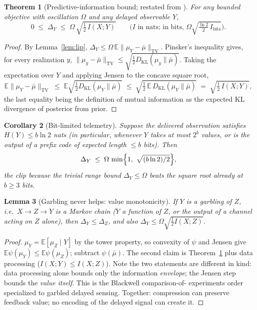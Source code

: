 \documentclass[11pt]{article}
\newtheorem{theorem}{Theorem}
\newtheorem{corollary}[theorem]{Corollary}
\newtheorem{lemma}[theorem]{Lemma}
\newcommand{\TV}{\mathrm{TV}}
\newcommand{\KL}{D_{\mathrm{KL}}}
\newcommand{\E}{\mathbb{E}}
\begin{document}
\begin{theorem}[Predictive-information bound; restated from {\cite{xu20,gyorfi23}}]\label{thm:mi}
For any bounded objective with oscillation $\Omega$ and any delayed
observable $Y$,
\begin{equation}\label{eq:mi}
0\;\le\;\Delta_Y\;\le\;\Omega\,\sqrt{\tfrac12\,I(X;Y)}
\qquad\text{($I$ in nats; in bits, }\Omega\sqrt{\tfrac{\ln 2}{2}\,I_{\mathrm{bits}}}\text{).}
\end{equation}
\end{theorem}

\begin{proof}
By Lemma~\ref{lem:lip}, $\Delta_Y\le\Omega\,\E\|\mu_Y-\bar\mu\|_{\TV}$.
Pinsker's inequality gives, for every realization $y$,
$\|\mu_y-\bar\mu\|_{\TV}\le\sqrt{\tfrac12\KL(\mu_y\|\bar\mu)}$. Taking the
expectation over $Y$ and applying Jensen to the concave square root,
\[
\E\|\mu_Y-\bar\mu\|_{\TV}
\;\le\;\E\sqrt{\tfrac12\KL(\mu_Y\|\bar\mu)}
\;\le\;\sqrt{\tfrac12\,\E\,\KL(\mu_Y\|\bar\mu)}
\;=\;\sqrt{\tfrac12\,I(X;Y)},
\]
the last equality being the definition of mutual information as the expected
KL divergence of posterior from prior.
\end{proof}

\begin{corollary}[Bit-limited telemetry]\label{cor:bits}
Suppose the delivered observation satisfies $H(Y)\le b\ln 2$ nats (in
particular, whenever $Y$ takes at most $2^b$ values, or is the output of a
prefix code of expected length $\le b$ bits). Then
\[
\Delta_Y\;\le\;\Omega\,\min\Bigl\{1,\ \sqrt{(b\ln 2)/2}\Bigr\},
\]
the clip because the trivial range bound $\Delta_Y\le\Omega$ beats the
square root already at $b\ge 3$ bits.
\end{corollary}

\begin{lemma}[Garbling never helps: value monotonicity]\label{lem:blackwell}
If $Y$ is a garbling of $Z$, i.e.\ $X\to Z\to Y$ is a Markov chain ($Y$ a
function of $Z$, or the output of a channel acting on $Z$ alone), then $\Delta_Y\le\Delta_Z$, and also
$\Delta_Y\le\Omega\sqrt{\tfrac12 I(X;Z)}$.
\end{lemma}
\begin{proof}
$\mu_Y=\E[\mu_Z\mid Y]$ by the tower property, so convexity of $\psi$ and
Jensen give $\E\psi(\mu_Y)\le\E\psi(\mu_Z)$; subtract $\psi(\bar\mu)$. The
second claim is Theorem~\ref{thm:mi} plus data processing
($I(X;Y)\le I(X;Z)$). Note the two statements are different in kind: data
processing alone bounds only the information \emph{envelope}; the Jensen
step bounds the \emph{value itself}. This is the Blackwell comparison-of-
experiments order \cite{blackwell53} specialized to garbled delayed
sensing. Together: compression can preserve feedback value; no encoding of
the delayed signal can create it.
\end{proof}
\end{document}
